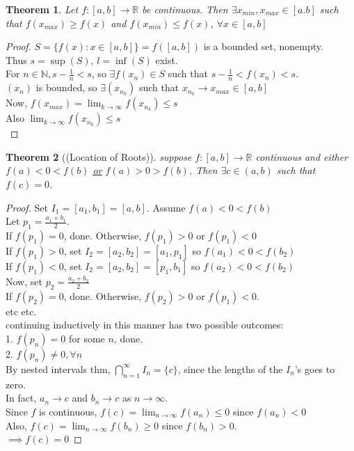 \documentclass{report}
\newcommand{\N}{\mathbb{N}}  %
\newcommand{\R}{\mathbb{R}}  %
\newcommand{\ul}[1]{\underline{#1}}  %
\newcommand{\xn}{(x_n)}
\newcommand{\xnkp}{(x_{n_k})}
\newcommand{\xnk}{x_{n_k}}
\theoremstyle{mystyle}
\newtheorem*{theorem}{Theorem}
\theoremstyle{customtheorem}
\begin{document}
    \begin{theorem}
        Let $f:[a,b]\to \R$ be continuous. Then $\exists x_{min}, x_{max} \in [a.b]$ such that $f(x_{max})\geq f(x)$ and $f(x_{min})\leq f(x)$, $\forall x\in[a,b]$
    \end{theorem}\vspace{-1.25em}
    \begin{proof}
        $S=\{f(x):x\in[a,b]\}=f([a,b])$ is a bounded set, nonempty.\\
        Thus $s=\sup(S)$, $l=\inf(S)$ exist. \\
        For $n\in \N, s-\frac{1}{n}<s$, so $\exists f(x_n)\in S$ such that $s-\frac{1}{n}<f(x_n)<s$.\\
        $\xn$ is bounded, so $\exists\xnkp$ such that $\xnk \to x_{max}\in[a,b]$\\
        Now, $f(x_{max})=\lim_{k\to\infty}f\xnkp\leq s$\\
        Also $\lim_{k\to\infty}f\xnkp\leq s$ \\
    \end{proof}

    \begin{theorem}[(Location of Roots)]
        suppose $f:[a,b]\to\R$ continuous and either $f(a)<0<f(b)$ \ul{or} $f(a)>0>f(b)$.
        Then $\exists c\in(a,b)$ such that $f(c)=0$.
    \end{theorem}
    \begin{proof}
        Set $I_1=[a_1,b_1]=[a,b]$. Assume $f(a)<0<f(b)$ \\
        Let $p_1=\frac{a_1+b_1}{2}$. \\
        If $f(p_1)=0$, done. Otherwise, $f(p_1) > 0$ or $f(p_1) < 0$\\
        If $f(p_1) > 0$, set $I_2=[a_2,b_2]=[a_1,p_1]$ so $f(a_1)<0<f(b_2)$ \\
        If $f(p_1) < 0$, set $I_2=[a_2,b_2]=[p_1,b_1]$ so $f(a_2)<0<f(b_2)$ \\
        Now, set $p_2=\frac{a_2+b_2}{2}$\\
        If $f(p_2)=0$, done. Otherwise, $f(p_2) > 0$ or $f(p_1) < 0$.\\
        etc etc. \\
        continuing inductively in this manner has two possible outcomes:\\
        1. $f(p_n)=0$ for some $n$, done.\\
        2. $f(p_n)\neq 0, \forall n$\\
        By nested intervals thm, $\bigcap_{n=1}^{\infty}I_n=\{c\}$, since the lengths of the $I_n$'s goes to zero. \\
        In fact, $a_n\to c$ and $b_n\to c$ as $n\to\infty$. \\
        Since $f$ is continuous, $f(c)=\lim_{n\to \infty}f(a_n)\leq 0$ since $f(a_n)<0$\\
        Also, $f(c)=\lim_{n\to \infty}f(b_n)\geq 0$ since $f(b_n)>0$. \\
        $\implies f(c)=0$
    \end{proof}
\end{document}
